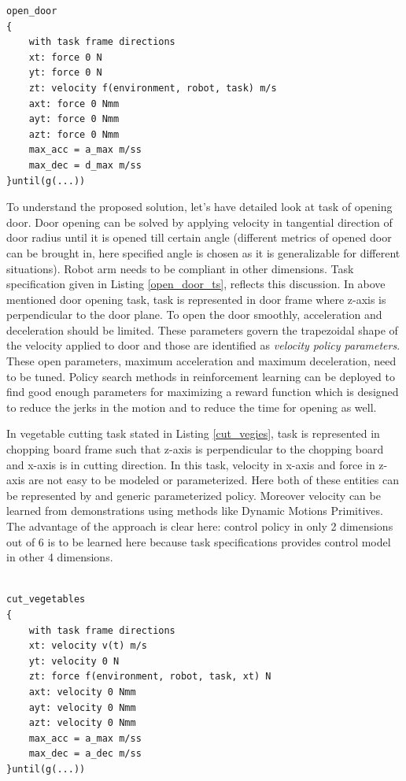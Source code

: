 \documentclass[thesis]{mas_proposal}
\begin{document}
\begin{lstlisting}[label=open_door_ts,caption=Task specification for opening door]
open_door
{
	with task frame directions
	xt: force 0 N
	yt: force 0 N
	zt: velocity f(environment, robot, task) m/s
	axt: force 0 Nmm
	ayt: force 0 Nmm
	azt: force 0 Nmm
	max_acc = a_max m/ss
	max_dec = d_max m/ss
}until(g(...))

\end{lstlisting}
To understand the proposed solution, let's have detailed look at task of opening door. Door opening can be solved by applying velocity in tangential direction of door radius until it is opened till certain angle (different metrics of opened door can be brought in, here specified angle is chosen as it is generalizable for different situations). Robot arm needs to be compliant in other dimensions. Task specification given in Listing \ref{open_door_ts}, reflects this discussion. In above mentioned door opening task, task is represented in door frame where z-axis is perpendicular to the door plane. To open the door smoothly, acceleration and deceleration should be limited. These parameters govern the trapezoidal shape of the velocity applied to door and those are identified as \textit{velocity policy parameters}. These open parameters, maximum acceleration and maximum deceleration, need to be tuned. Policy search methods in reinforcement learning can be deployed to find good enough parameters for maximizing a reward function which is designed to reduce the jerks in the motion and to reduce the time for opening as well.

In vegetable cutting task stated in Listing \ref{cut_vegies}, task is represented in chopping board frame such that z-axis is perpendicular to the chopping board and x-axis is in cutting direction. In this task, velocity in x-axis and force in z-axis are not easy to be modeled or parameterized. Here both of these entities can be represented by and generic parameterized policy. Moreover velocity can be learned from demonstrations using methods like Dynamic Motions Primitives\cite{lioutikov2016learning}. The advantage of the approach is clear here: control policy in only 2 dimensions out of 6 is to be learned here because task specifications provides control model in other 4 dimensions. 

\begin{lstlisting}[label=cut_vegies,caption=Task specification for cutting vegetables]

cut_vegetables
{
	with task frame directions
	xt: velocity v(t) m/s
	yt: velocity 0 N
	zt: force f(environment, robot, task, xt) N
	axt: velocity 0 Nmm
	ayt: velocity 0 Nmm
	azt: velocity 0 Nmm
	max_acc = a_max m/ss
	max_dec = a_dec m/ss
}until(g(...))

\end{lstlisting}
\end{document}
